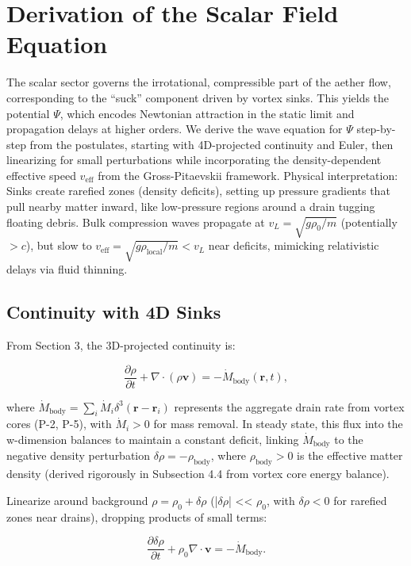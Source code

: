\documentclass{article}
\begin{document}
\section{Derivation of the Scalar Field Equation}

The scalar sector governs the irrotational, compressible part of the aether flow, corresponding to the ``suck'' component driven by vortex sinks. This yields the potential $\Psi$, which encodes Newtonian attraction in the static limit and propagation delays at higher orders. We derive the wave equation for $\Psi$ step-by-step from the postulates, starting with 4D-projected continuity and Euler, then linearizing for small perturbations while incorporating the density-dependent effective speed $v_{\text{eff}}$ from the Gross-Pitaevskii framework. Physical interpretation: Sinks create rarefied zones (density deficits), setting up pressure gradients that pull nearby matter inward, like low-pressure regions around a drain tugging floating debris. Bulk compression waves propagate at $v_L = \sqrt{g \rho_0 / m}$ (potentially $> c$), but slow to $v_{\text{eff}} = \sqrt{g \rho_{\text{local}} / m} < v_L$ near deficits, mimicking relativistic delays via fluid thinning.

\subsection{Continuity with 4D Sinks}

From Section 3, the 3D-projected continuity is:

\[
\frac{\partial \rho}{\partial t} + \nabla \cdot (\rho \mathbf{v}) = -\dot{M}_{\text{body}}(\mathbf{r}, t),
\]

where $\dot{M}_{\text{body}} = \sum_i \dot{M}_i \delta^3(\mathbf{r} - \mathbf{r}_i)$ represents the aggregate drain rate from vortex cores (P-2, P-5), with $\dot{M}_i > 0$ for mass removal. In steady state, this flux into the w-dimension balances to maintain a constant deficit, linking $\dot{M}_{\text{body}}$ to the negative density perturbation $\delta \rho = -\rho_{\text{body}}$, where $\rho_{\text{body}} > 0$ is the effective matter density (derived rigorously in Subsection 4.4 from vortex core energy balance).

Linearize around background $\rho = \rho_0 + \delta \rho$ (|$ \delta \rho $| << $\rho_0$, with $\delta \rho < 0$ for rarefied zones near drains), dropping products of small terms:

\[
\frac{\partial \delta \rho}{\partial t} + \rho_0 \nabla \cdot \mathbf{v} = -\dot{M}_{\text{body}}.
\]
\end{document}
